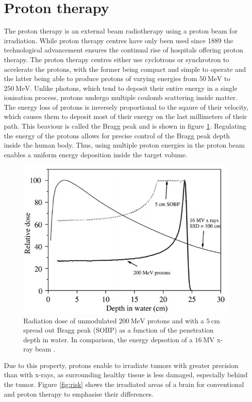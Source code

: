 \section{Proton therapy}
The proton therapy is an external beam radiotherapy using a proton beam for irradiation. While proton therapy centres have only been used since 1889 the technological
advancement ensures the continual rise of hospitals offering proton therapy.
The proton therapy centres either use cyclotrons or synchrotron to accelerate the protons, with the former being compact and simple to operate and the latter being able
to produce protons of varying energies from $\SI{50}{\MeV}$ to $\SI{250}{\MeV}$.
Unlike photons, which tend to deposit their entire energy in a single ionisation process, protons undergo multiple coulomb scattering inside matter. The
energy loss of protons is inversely proportional to the sqaure of their velocity, which causes them to deposit most of their energy on the last millimeters of their path.
This beaviour is called the Bragg peak and is shown in figure \ref{fig:bragg}. Regulating the energy of the protons allows for precise control of the Bragg peak depth inside
the human body. Thus, using multiple proton energies in the proton beam enables a uniform energy deposition inside the target volume.

\begin{figure}
  \centering
  \includegraphics[height=0.6\textwidth]{images/tiefendosis.png}
  \caption{Radiation dose of unmodulated $\SI{200}{\mega\eV}$ protons and with a $\SI{5}{\centi\meter}$ spread out Bragg peak (SOBP)
  as a function of the penetration depth in water. In comparison, the energy depsotion of a $\SI{16}{\mega\volt}$ x-ray beam \cite{bragg}.}
  \label{fig:bragg}
\end{figure}
Due to this property, protons enable to irradiate tumors with greater precision than with
x-rays, as surrounding healthy tissue is less damaged, especially behind the tumor. Figure \ref{fig:risk} shows the irradiated areas of a brain for conventional and
proton therapy to emphasise their differences.

